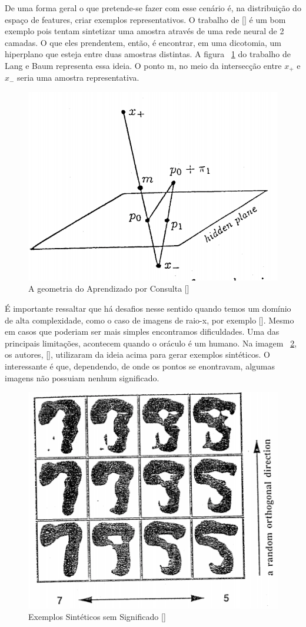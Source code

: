 De uma forma geral o que pretende-se fazer com esse cenário é, na distribuição do espaço de features, criar exemplos representativos. O trabalho de [\cite{baum1992query}] é um bom exemplo pois tentam sintetizar uma amostra através de uma rede neural de 2 camadas. O que eles prendentem, então, é encontrar, em uma dicotomia, um hiperplano que esteja entre duas amostras distintas. A figura ~\ref{fig:LangBaum_GeometryQueryLearning} do trabalho de Lang e Baum representa essa ideia. O ponto m, no meio da intersecção entre $x_+$ e $x_-$ seria uma amostra representativa.

\begin{figure}
  \centering
  \includegraphics[width=.4\textwidth]{figures/lang_baum_geometry_query_learning.png}
  \caption{A geometria do Aprendizado por Consulta [\cite{baum1992query}]}
  \label{fig:LangBaum_GeometryQueryLearning}
\end{figure}

É importante ressaltar que há desafios nesse sentido quando temos um domínio de alta complexidade, como o caso de imagens de raio-x, por exemplo [\cite{angluin1988queries}]. Mesmo em casos que poderiam ser mais simples encontramos dificuldades. Uma das principais limitações, acontecem quando o oráculo é um humano. Na imagem ~\ref{fig:LangBaum_5vs9Example}, os autores, [\cite{baum1992query}], utilizaram da ideia acima para gerar exemplos sintéticos. O interessante é que, dependendo, de onde os pontos se enontravam, algumas imagens não possuiam nenhum significado. 

\begin{figure}
  \centering
  \includegraphics[width=.4\textwidth]{figures/lang_baum_5_vs_9_example.png}
  \caption{Exemplos Sintéticos sem Significado [\cite{baum1992query}]}
  \label{fig:LangBaum_5vs9Example}
\end{figure}

